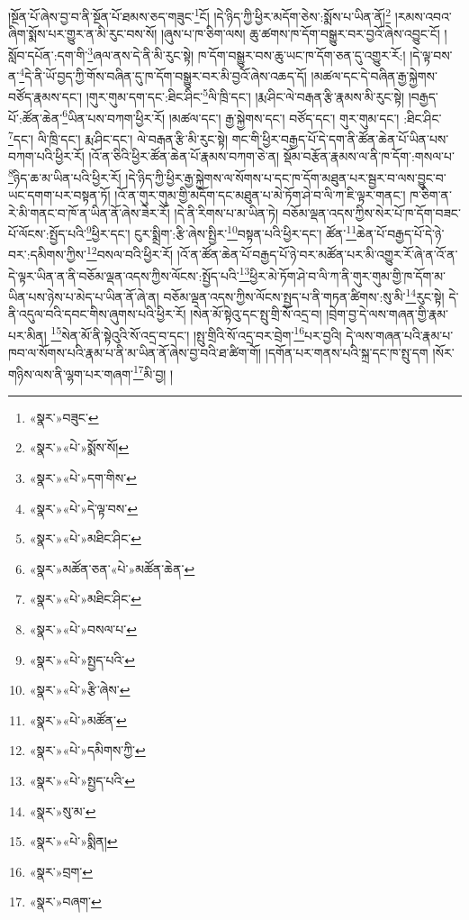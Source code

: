 །སྔོན་པོ་ཞེས་བྱ་བ་ནི་སྔོན་པོ་ཐམས་ཅད་གཟུང་\footnote{«སྣར་»བཟུང་}ངོ། །དེ་ཉིད་ཀྱི་ཕྱིར་མདོག་ཅེས་:སྨོས་པ་ཡིན་ནོ།\footnote{«སྣར་»«པེ་»སྨོས་སོ།} །རམས་འབའ་ཞིག་སྨོས་པར་གྱུར་ན་མི་རུང་བས་སོ། །ཞུས་པ་ཁ་ཅིག་ལས། ཆུ་ཚགས་ཁ་དོག་བསྒྱུར་བར་བྱའོ་ཞེས་འབྱུང་ངོ། །སློབ་དཔོན་:དག་གི་\footnote{«སྣར་»«པེ་»དག་གིས་}ཞལ་ནས་དེ་ནི་མི་རུང་སྟེ། ཁ་དོག་བསྒྱུར་བས་ཆུ་ཡང་ཁ་དོག་ཅན་དུ་འགྱུར་རོ:། །དེ་ལྟ་བས་ན་\footnote{«སྣར་»«པེ་»དེ་ལྟ་བས་}དེ་ནི་ཡོ་བྱད་ཀྱི་གོས་བཞིན་དུ་ཁ་དོག་བསྒྱུར་བར་མི་བྱའོ་ཞེས་འཆད་དོ། །མཚལ་དང་དེ་བཞིན་རྒྱ་སྐྱེགས་བཙོད་རྣམས་དང་། །གུར་གུམ་དག་དང་:ཐིང་ཤིང་\footnote{«སྣར་»«པེ་»མཐིང་ཤིང་}ལི་ཁྲི་དང་། །རྨ་ཤིང་ལེ་བརྒན་རྩི་རྣམས་མི་རུང་སྟེ། །བརྒྱད་པོ་:ཚོན་ཆེན་\footnote{«སྣར་»མཚོན་ཅན་«པེ་»མཚོན་ཆེན་}ཡིན་པས་བཀག་ཕྱིར་རོ། །མཚལ་དང་། རྒྱ་སྐྱེགས་དང་། བཙོད་དང་། གུར་གུམ་དང་། :ཐིང་ཤིང་\footnote{«སྣར་»«པེ་»མཐིང་ཤིང་}དང་། ལི་ཁྲི་དང་། རྨ་ཤིང་དང་། ལེ་བརྒན་རྩི་མི་རུང་སྟེ། གང་གི་ཕྱིར་བརྒྱད་པོ་དེ་དག་ནི་ཚོན་ཆེན་པོ་ཡིན་པས་བཀག་པའི་ཕྱིར་རོ། །འོ་ན་ཅིའི་ཕྱིར་ཚོན་ཆེན་པོ་རྣམས་བཀག་ཅེ་ན། སྡོམ་བརྩོན་རྣམས་ལ་ནི་ཁ་དོག་:གསལ་པ་\footnote{«སྣར་»«པེ་»བསལ་པ་}ཉིད་ཆ་མ་ཡིན་པའི་ཕྱིར་རོ། །དེ་ཉིད་ཀྱི་ཕྱིར་རྒྱ་སྐྱེགས་ལ་སོགས་པ་དང་ཁ་དོག་མཐུན་པར་སྦྱར་བ་ལས་བྱུང་བ་ཡང་དགག་པར་བསྟན་ཏོ། །འོ་ན་གུར་གུམ་གྱི་མདོག་དང་མཐུན་པ་མེ་ཏོག་ཤེ་བ་ལི་ཀ་ཇི་ལྟར་གནང་། ཁ་ཅིག་ན་རེ་མི་གནང་བ་ཁོ་ན་ཡིན་ནོ་ཞེས་ཟེར་རོ། །དེ་ནི་རིགས་པ་མ་ཡིན་ཏེ། བཅོམ་ལྡན་འདས་ཀྱིས་སེར་པོ་ཁ་དོག་བཟང་པོ་ལོངས་:སྤྱོད་པའི་\footnote{«སྣར་»«པེ་»སྤྱད་པའི་}ཕྱིར་དང་། ངུར་སྨྲིག་:རྩི་ཞེས་སྤྱིར་\footnote{«སྣར་»«པེ་»རྩི་ཞེས་}བསྟན་པའི་ཕྱིར་དང་། ཚོན་\footnote{«སྣར་»«པེ་»མཚོན་}ཆེན་པོ་བརྒྱད་པོ་དེ་ཉེ་བར་:དམིགས་ཀྱིས་\footnote{«སྣར་»«པེ་»དམིགས་ཀྱི་}བསལ་བའི་ཕྱིར་རོ། །འོ་ན་ཚོན་ཆེན་པོ་བརྒྱད་པོ་ཉེ་བར་མཚོན་པར་མི་འགྱུར་རོ་ཞེ་ན་འོ་ན་དེ་ལྟར་ཡིན་ན་ནི་བཅོམ་ལྡན་འདས་ཀྱིས་ལོངས་:སྤྱོད་པའི་\footnote{«སྣར་»«པེ་»སྤྱད་པའི་}ཕྱིར་མེ་ཏོག་ཤེ་བ་ལི་ཀ་ནི་གུར་གུམ་གྱི་ཁ་དོག་མ་ཡིན་པས་ཉེས་པ་མེད་པ་ཡིན་ནོ་ཞེ་ན། བཅོམ་ལྡན་འདས་ཀྱིས་ལོངས་སྤྱད་པ་ནི་གཏན་ཚིགས་:སུ་མི་\footnote{«སྣར་»སུ་མ་}རུང་སྟེ། དེ་ནི་འདུལ་བའི་དབང་གིས་ཞུགས་པའི་ཕྱིར་རོ། །སེན་མོ་སྟེའུ་དང་སྤུ་གྲི་སོ་འདྲ་བ། །བྲེག་བྱ་དེ་ལས་གཞན་གྱི་རྣམ་པར་མིན། \footnote{«སྣར་»«པེ་»སྨིན། }སེན་མོ་ནི་སྟེའུའི་སོ་འདྲ་བ་དང་། །སྤུ་གྲིའི་སོ་འདྲ་བར་བྲེག་\footnote{«སྣར་»བྲག་}པར་བྱའི། དེ་ལས་གཞན་པའི་རྣམ་པ་ཁབ་ལ་སོགས་པའི་རྣམ་པ་ནི་མ་ཡིན་ནོ་ཞེས་བྱ་བའི་ཐ་ཚིག་གོ། །དགོན་པར་གནས་པའི་སྐྲ་དང་ཁ་སྤུ་དག །སོར་གཉིས་ལས་ནི་ལྷག་པར་གཞག་\footnote{«སྣར་»བཞག་}མི་བྱ། །
